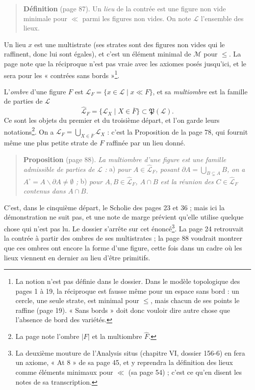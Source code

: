 \documentclass[11pt,a4paper]{article}
\begin{document}
\begin{quote}
\textbf{Définition} (page 87). Un \emph{lieu} de la contrée est une figure non
vide minimale pour $\ll$ parmi les figures non vides. On note $\mathcal{L}$
l'ensemble des lieux.
\end{quote}

Un lieu $x$ est une multistrate (ses strates sont des figures non vides qui
le raffinent, donc lui sont égales), et c'est un élément minimal de
$\mathcal{M}$ pour $\leq$. La page note que la réciproque n'est pas vraie avec
les axiomes posés jusqu'ici, et le sera pour les « contrées sans
bords »\footnote{La notion n'est pas définie dans le dossier. Dans le modèle
topologique des pages 1 à 19, la réciproque est fausse même pour un espace sans
bord : un cercle, une seule strate, est minimal pour $\leq$, mais chacun de ses
points le raffine (page 19). « Sans bords » doit donc vouloir dire autre chose
que l'absence de bord des variétés.}.

L'\emph{ombre} d'une figure $F$ est $\mathcal{L}_{F} = \{x \in \mathcal{L} \mid
x \ll F\}$, et sa \emph{multiombre} est la famille de parties de $\mathcal{L}$
\[
\widehat{\mathcal{L}}_{F} = \{\mathcal{L}_{X} \mid X \in \overline{F}\} \subset
\mathfrak{P}(\mathcal{L}).
\]
Ce sont les objets du premier et du troisième départ, et l'on garde leurs
notations\footnote{La page note l'ombre $|F|$ et la multiombre
$\widehat{F}$.}.
On a $\mathcal{L}_{F} = \bigcup_{X \in \overline{F}} \mathcal{L}_{X}$ : c'est
la Proposition de la page 78, qui fournit même une plus petite strate de $F$
raffinée par un lieu donné.

\begin{quote}
\textbf{Proposition} (page 88). \emph{La multiombre d'une figure est une famille
admissible de parties de $\mathcal{L}$ :} a) \emph{pour $A \in
\widehat{\mathcal{L}}_{F}$, posant $\partial A = \bigcup_{B \subsetneq A} B$, on
a $A^{\circ} = A \smallsetminus \partial A \neq \emptyset$ ;} b) \emph{pour $A,
B \in \widehat{\mathcal{L}}_{F}$, $A \cap B$ est la réunion des $C \in
\widehat{\mathcal{L}}_{F}$ contenus dans $A \cap B$.}
\end{quote}

C'est, dans le cinquième départ, le Scholie des pages 23 et 36 ; mais ici la
démonstration ne suit pas, et une note de marge prévient qu'elle utilise
quelque chose qui n'est pas lu. Le dossier s'arrête sur cet énoncé\footnote{La
deuxième mouture de l'Analysis situs (chapitre VI, dossier 156-6) en fera un
axiome, « At 8 » de sa page 45, et y reprendra la définition des lieux comme
éléments minimaux pour $\ll$ (sa page 54) ; c'est ce qu'en disent les notes de
sa transcription.}. La page 24
retrouvait la contrée à partir des ombres de ses multistrates ; la page 88
voudrait montrer que ces ombres ont encore la forme d'une figure, cette fois
dans un cadre où les lieux viennent en dernier au lieu d'être primitifs.
\end{document}
